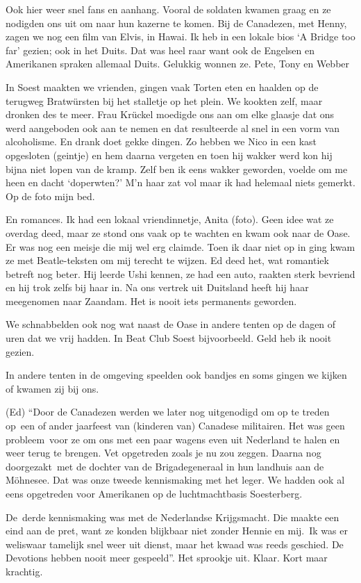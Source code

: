 \documentclass[10pt,twoside,openright]{memoir}
\begin{document}
Ook hier weer snel fans en aanhang. Vooral de soldaten kwamen graag en ze nodigden ons uit om naar hun kazerne te komen. Bij de Canadezen, met Henny, zagen we nog een film van Elvis, in Hawai. Ik heb in een lokale bios ‘A Bridge too far’ gezien; ook in het Duits. Dat was heel raar want ook de Engelsen en Amerikanen spraken allemaal Duits. Gelukkig wonnen ze. Pete, Tony en Webber

In Soest maakten we vrienden, gingen vaak Torten eten en haalden op de terugweg Bratwürsten bij het stalletje op het plein. We kookten zelf, maar dronken des te meer. Frau Krückel moedigde ons aan om elke glaasje dat ons werd aangeboden ook aan te nemen en dat resulteerde al snel in een vorm van alcoholisme. En drank doet gekke dingen. Zo hebben we Nico in een kast opgesloten (geintje) en hem daarna vergeten en toen hij wakker werd kon hij bijna niet lopen van de kramp. Zelf ben ik eens wakker geworden, voelde om me heen en dacht ‘doperwten?’ M’n haar zat vol maar ik had helemaal niets gemerkt. Op de foto mijn bed.

En romances. Ik had een lokaal vriendinnetje, Anita (foto). Geen idee wat ze overdag deed, maar ze stond ons vaak op te wachten en kwam ook naar de Oase. Er was nog een meisje die mij wel erg claimde. Toen ik daar niet op in ging kwam ze met Beatle-teksten om mij terecht te wijzen. Ed deed het, wat romantiek betreft nog beter. Hij leerde Ushi kennen, ze had een auto, raakten sterk bevriend en hij trok zelfs bij haar in. Na ons vertrek uit Duitsland heeft hij haar meegenomen naar Zaandam. Het is nooit iets permanents geworden.

We schnabbelden ook nog wat naast de Oase in andere tenten op de dagen of uren dat we vrij hadden. In Beat Club Soest bijvoorbeeld. Geld heb ik nooit gezien. 

In andere tenten in de omgeving speelden ook bandjes en soms gingen we kijken of kwamen zij bij ons. 	

(Ed) “Door de Canadezen werden we later nog uitgenodigd om op te treden op een of ander jaarfeest van (kinderen van) Canadese militairen. Het was geen probleem voor ze om ons met een paar wagens even uit Nederland te halen en weer terug te brengen. Vet opgetreden zoals je nu zou zeggen. Daarna nog doorgezakt met de dochter van de Brigadegeneraal in hun landhuis aan de Möhnesee. Dat was onze tweede kennismaking met het leger. We hadden ook al eens opgetreden voor Amerikanen op de luchtmachtbasis Soesterberg. 

De derde kennismaking was met de Nederlandse Krijgsmacht. Die maakte een eind aan de pret, want ze konden blijkbaar niet zonder Hennie en mij. Ik was er weliswaar tamelijk snel weer uit dienst, maar het kwaad was reeds geschied. De Devotions hebben nooit meer gespeeld”. Het sprookje uit. Klaar. Kort maar krachtig.
\end{document}
